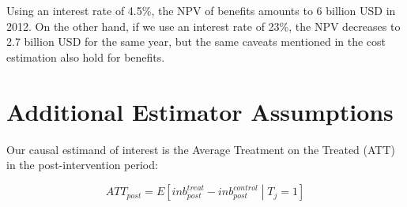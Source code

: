 \documentclass[12pt,letterpaper]{article}
\begin{document}
Using an interest rate of 4.5\%, the NPV of benefits amounts to 6 billion USD in 2012. On the other hand, if we use an interest rate of 23\%, the NPV decreases to 2.7 billion USD for the same year, but the same caveats mentioned in the cost estimation also hold for benefits.






\section{Additional Estimator Assumptions}
\label{app:estimator}
Our causal estimand of interest is the Average Treatment on the Treated (ATT) in the post-intervention period:

\begin{equation*}
    ATT_{post}=E\left[inb_{post}^{treat}-inb_{post}^{control} \middle| T_{j}=1\right]
\end{equation*}
\end{document}
